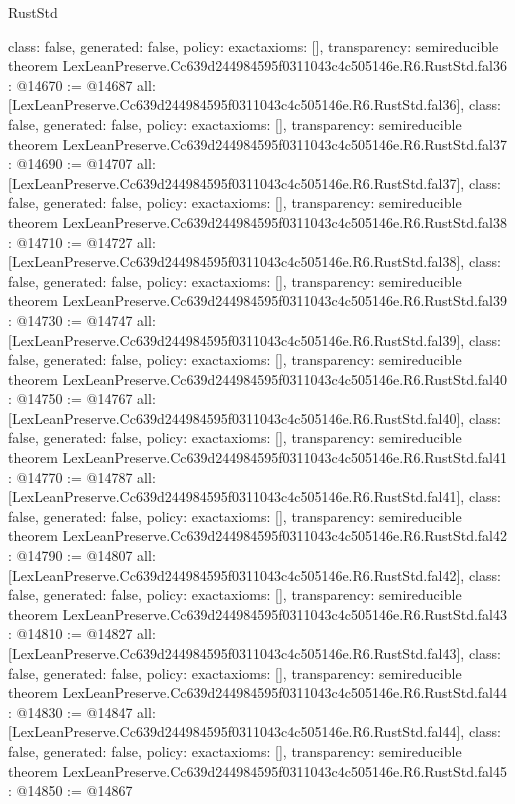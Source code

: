 \begin{lexlean}{RustStd}
\begin{coremodule}
{  class: false,
  generated: false,
  policy: exact{axioms: []},
  transparency: semireducible
}
theorem LexLeanPreserve.Cc639d244984595f0311043c4c505146e.R6.RustStd.fal36 : @14670 := @14687 {
  all: [LexLeanPreserve.Cc639d244984595f0311043c4c505146e.R6.RustStd.fal36],
  class: false,
  generated: false,
  policy: exact{axioms: []},
  transparency: semireducible
}
theorem LexLeanPreserve.Cc639d244984595f0311043c4c505146e.R6.RustStd.fal37 : @14690 := @14707 {
  all: [LexLeanPreserve.Cc639d244984595f0311043c4c505146e.R6.RustStd.fal37],
  class: false,
  generated: false,
  policy: exact{axioms: []},
  transparency: semireducible
}
theorem LexLeanPreserve.Cc639d244984595f0311043c4c505146e.R6.RustStd.fal38 : @14710 := @14727 {
  all: [LexLeanPreserve.Cc639d244984595f0311043c4c505146e.R6.RustStd.fal38],
  class: false,
  generated: false,
  policy: exact{axioms: []},
  transparency: semireducible
}
theorem LexLeanPreserve.Cc639d244984595f0311043c4c505146e.R6.RustStd.fal39 : @14730 := @14747 {
  all: [LexLeanPreserve.Cc639d244984595f0311043c4c505146e.R6.RustStd.fal39],
  class: false,
  generated: false,
  policy: exact{axioms: []},
  transparency: semireducible
}
theorem LexLeanPreserve.Cc639d244984595f0311043c4c505146e.R6.RustStd.fal40 : @14750 := @14767 {
  all: [LexLeanPreserve.Cc639d244984595f0311043c4c505146e.R6.RustStd.fal40],
  class: false,
  generated: false,
  policy: exact{axioms: []},
  transparency: semireducible
}
theorem LexLeanPreserve.Cc639d244984595f0311043c4c505146e.R6.RustStd.fal41 : @14770 := @14787 {
  all: [LexLeanPreserve.Cc639d244984595f0311043c4c505146e.R6.RustStd.fal41],
  class: false,
  generated: false,
  policy: exact{axioms: []},
  transparency: semireducible
}
theorem LexLeanPreserve.Cc639d244984595f0311043c4c505146e.R6.RustStd.fal42 : @14790 := @14807 {
  all: [LexLeanPreserve.Cc639d244984595f0311043c4c505146e.R6.RustStd.fal42],
  class: false,
  generated: false,
  policy: exact{axioms: []},
  transparency: semireducible
}
theorem LexLeanPreserve.Cc639d244984595f0311043c4c505146e.R6.RustStd.fal43 : @14810 := @14827 {
  all: [LexLeanPreserve.Cc639d244984595f0311043c4c505146e.R6.RustStd.fal43],
  class: false,
  generated: false,
  policy: exact{axioms: []},
  transparency: semireducible
}
theorem LexLeanPreserve.Cc639d244984595f0311043c4c505146e.R6.RustStd.fal44 : @14830 := @14847 {
  all: [LexLeanPreserve.Cc639d244984595f0311043c4c505146e.R6.RustStd.fal44],
  class: false,
  generated: false,
  policy: exact{axioms: []},
  transparency: semireducible
}
theorem LexLeanPreserve.Cc639d244984595f0311043c4c505146e.R6.RustStd.fal45 : @14850 := @14867 {
}
\end{coremodule}
\end{lexlean}

